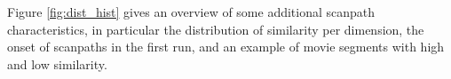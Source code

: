 \documentclass[a4paper, 12pt]{scrreprt}
\makeatletter
\def\thickhline{%
	\noalign{\ifnum0=`}\fi\hrule \@height \thickarrayrulewidth \futurelet
	\reserved@a\@xthickhline}
\def\@xthickhline{\ifx\reserved@a\thickhline
	\vskip\doublerulesep
	\vskip-\thickarrayrulewidth
	\fi
	\ifnum0=`{\fi}}
\newlength{\thickarrayrulewidth}
\makeatother
\begin{document}



Figure \ref{fig:dist_hist} gives an overview of some additional scanpath characteristics, in particular the distribution of similarity per dimension, the onset of scanpaths in the first run, and an example of movie segments with high and low similarity.
\end{document}
